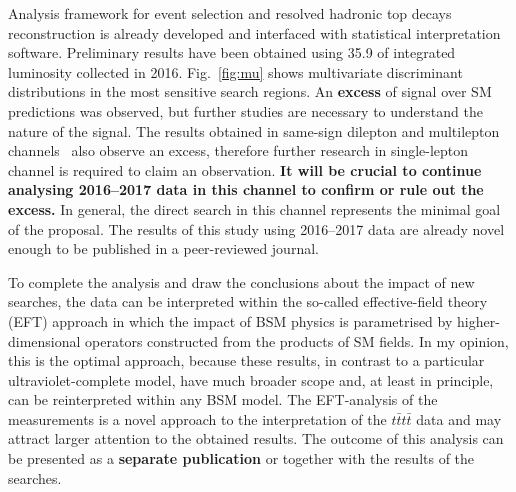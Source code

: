 {Analysis framework for event selection and resolved hadronic top decays reconstruction is already developed and interfaced with statistical interpretation software. Preliminary results have been obtained using 35.9 \invfb of integrated luminosity collected in 2016. Fig.~\ref{fig:mu} shows multivariate discriminant distributions in the most sensitive search regions. An \textbf{excess} of signal over SM predictions was observed, but further studies are necessary to understand the nature of the signal. The results obtained in same-sign dilepton and multilepton channels~\cite{Sirunyan:2017roi} also observe an excess, therefore further research in single-lepton channel is required to claim an observation. \textbf{It will be crucial to continue analysing 2016--2017 data in this channel to confirm or rule out the excess.} In general, the direct search in this channel represents the minimal goal of the proposal. The results of this study using 2016--2017 data are already novel enough to be published in a peer-reviewed journal. }

\textcolor{\mynew}{
To complete the analysis and draw the conclusions about the impact of new searches, the data can be interpreted within the so-called effective-field theory (EFT) approach in which the impact of BSM physics is parametrised by higher-dimensional operators constructed from the products of SM fields. In my opinion, this is the optimal approach, because these results, in contrast to a particular ultraviolet-complete model, have much broader scope and, at least in principle, can be reinterpreted within any BSM model. The EFT-analysis of the measurements is a novel approach to the interpretation of the $t\bar{t}t\bar{t}$ data and may attract larger attention to the obtained results. The outcome of this analysis can be presented as a \textbf{separate publication} or together with the results of the searches. }

